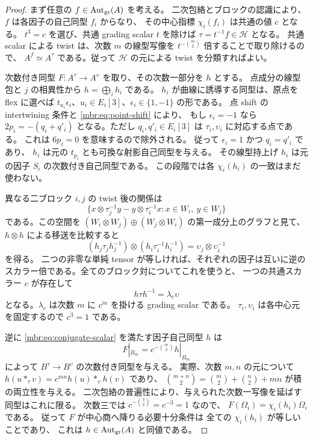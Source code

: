 \begin{proof}
まず任意の $f\in\operatorname{Aut}_{\mathrm{gr}}(A)$ を考える。
二次包絡とブロックの認識により、$f$ は各因子の自己同型 $f_i$ からなり、
その中心指標 $\chi_i(f_i)$ は共通の値 $c$ となる。
$t^3=c$ を選び、共通 grading scalar $t$ を除けば
$\tau=t^{-1}f\in\mathcal H$ となる。
共通 scalar による twist は、次数 $m$ の線型写像を
$t^{-\binom m2}$ 倍することで取り除けるので、
$A^f\simeq A^\tau$ である。従って $\mathcal H$ の元による twist を分類すればよい。

次数付き同型 $F:A^\tau\to A^\upsilon$ を取り、その次数一部分を $h$ とする。
点成分の線型包と $j$ の相異性から $h=\bigoplus_i h_i$ である。
$h_i$ が曲線に誘導する同型は、原点を flex に選べば
$t_{u_i}\epsilon_i$、$u_i\in E_i[3]$、$\epsilon_i\in\{1,-1\}$ の形である。
点 shift の intertwining 条件と \eqref{mbr:eq:point-shift} により、
もし $\epsilon_i=-1$ なら
$2p_i=-(q_i+q'_i)$ となる。ただし $q_i,q'_i\in E_i[3]$ は
$\tau_i,\upsilon_i$ に対応する点である。
これは $6p_i=0$ を意味するので除外される。
従って $\epsilon_i=1$ かつ $q_i=q'_i$ であり、
$h_i$ は元の $t_{p_i}$ とも可換な射影自己同型を与える。
その線型持上げ $h_i$ は元の因子 $S_i$ の次数付き自己同型である。
この段階では各 $\chi_i(h_i)$ の一致はまだ使わない。

異なる二ブロック $i,j$ の twist 後の関係は
\begin{equation}\label{mbr:eq:mixed-graph}
 \{x\otimes\tau_j^{-1}y-y\otimes\tau_i^{-1}x:
                         x\in W_i,\ y\in W_j\}
\end{equation}
である。この空間を
$(W_i\otimes W_j)\oplus(W_j\otimes W_i)$ の第一成分上のグラフと見て、
$h\otimes h$ による移送を比較すると
\[
 (h_j\tau_jh_j^{-1})\otimes(h_i\tau_i^{-1}h_i^{-1})
       =\upsilon_j\otimes\upsilon_i^{-1}
\]
を得る。
二つの非零な単純 tensor が等しければ、それぞれの因子は互いに逆の
スカラー倍である。全てのブロック対についてこれを使うと、
一つの共通スカラー $c$ が存在して
\begin{equation}\label{mbr:eq:conjugate-scalar}
 h\tau h^{-1}=\lambda_c\upsilon
\end{equation}
となる。$\lambda_c$ は次数 $m$ に $c^m$ を掛ける grading scalar である。
$\tau_i,\upsilon_i$ は各中心元を固定するので $c^3=1$ である。

逆に \eqref{mbr:eq:conjugate-scalar} を満たす因子自己同型 $h$ は
\begin{equation}\label{mbr:eq:isom-formula}
 F|_{B_m}=c^{-\binom m2}h|_{B_m}
\end{equation}
によって $B^\tau\to B^\upsilon$ の次数付き同型を与える。
実際、次数 $m,n$ の元について
$h(u*_{\tau}v)=c^{mn}h(u)*_{\upsilon}h(v)$ であり、
$\binom{m+n}{2}=\binom m2+\binom n2+mn$ が積の両立性を与える。
二次包絡の普遍性により、与えられた次数一写像を延ばす同型はこれに限る。
次数三では $c^{-\binom32}=c^{-3}=1$ なので、
$F(\Omega_i)=\chi_i(h_i)\Omega_i$ である。
従って $F$ が中心商へ降りる必要十分条件は
全ての $\chi_i(h_i)$ が等しいことであり、
これは $h\in\operatorname{Aut}_{\mathrm{gr}}(A)$ と同値である。


\end{proof}

